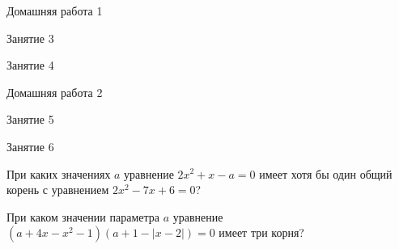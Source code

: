 \begin{homework}[number=1]
	\begin{listofex}
		\item Домашняя работа 1
	\end{listofex}
\end{homework}

\begin{class}[number=3]
	\begin{listofex}
		\item Занятие 3 
	\end{listofex}
\end{class}

\begin{class}[number=4]
	\begin{listofex}
		\item Занятие 4
	\end{listofex}
\end{class}

\begin{homework}[number=2]
	\begin{listofex}
		\item Домашняя работа 2
	\end{listofex}
\end{homework}

\begin{class}[number=5]
	\begin{listofex}
		\item Занятие 5
	\end{listofex}
\end{class}

\begin{class}[number=6]
	\begin{listofex}
		\item Занятие 6
	\end{listofex}
\end{class}

\begin{homework}[number=3]
	\begin{listofex}
		\item При каких значениях \( a \) уравнение \( 2x^2+x-a=0 \) имеет хотя бы один общий корень с уравнением \( 2x^2-7x+6=0 \)?
		\item При каком значении параметра \( a \) уравнение \\ \( (a+4x-x^2-1)(a+1-|x-2|)=0 \) имеет три корня?
	\end{listofex}
\end{homework}

